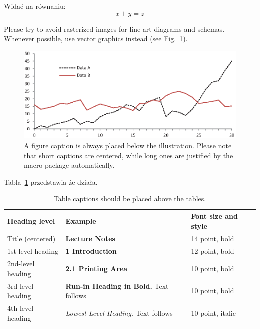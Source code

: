 \documentclass[]{llncs}
\begin{document}
\noindent Widać na równaniu:
\begin{equation}
  x + y = z
\end{equation}

Please try to avoid rasterized images for line-art diagrams and
schemas. Whenever possible, use vector graphics instead (see
Fig.~\ref{fig1}).

\begin{figure}
  \includegraphics[width=\textwidth]{fig1.eps}
  \caption{A figure caption is always placed below the illustration.
    Please note that short captions are centered, while long ones are
  justified by the macro package automatically.} \label{fig1}
\end{figure}

Tabla~\ref{tab1} przedstawia że działa.

\begin{table}
  \caption{Table captions should be placed above the
  tables.}\label{tab1}
  \begin{tabular}{|l|l|l|}
    \hline
    Heading level &  Example & Font size and style\\
    \hline
    Title (centered) &  {\Large\bfseries Lecture Notes} & 14 point, bold\\
    1st-level heading &  {\large\bfseries 1 Introduction} & 12 point, bold\\
    2nd-level heading & {\bfseries 2.1 Printing Area} & 10 point, bold\\
    3rd-level heading & {\bfseries Run-in Heading in Bold.} Text follows & 10 point, bold\\
    4th-level heading & {\itshape Lowest Level Heading.} Text follows & 10 point, italic\\
    \hline
  \end{tabular}
\end{table}

\end{document}
